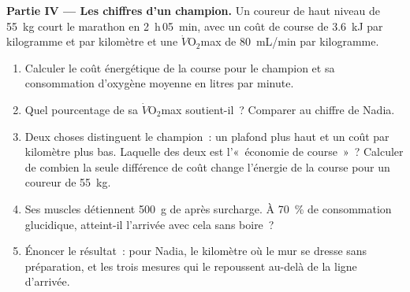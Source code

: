 \begin{problem}
\medskip
\noindent\textbf{Partie IV --- Les chiffres d'un champion.}
Un coureur de haut niveau de \qty{55}{kg} court le marathon en
\qty{2}{h}\,\qty{05}{min}, avec un coût de course de \qty{3.6}{kJ} par
kilogramme et par kilomètre et une $\dot V\!\mathrm{O_2}$max de
\qty{80}{mL/min} par kilogramme.
\begin{enumerate}[resume]
  \item Calculer le coût énergétique de la course pour le champion et
        sa consommation d'oxygène moyenne en litres par minute.
  \item Quel pourcentage de sa $\dot V\!\mathrm{O_2}$max
        soutient-il~? Comparer au chiffre de Nadia.
  \item Deux choses distinguent le champion~: un plafond plus haut et
        un coût par kilomètre plus bas. Laquelle des deux est
        l'«~économie de course~»~? Calculer de combien la seule
        différence de coût change l'énergie de la course pour un
        coureur de \qty{55}{kg}.
  \item Ses muscles détiennent \qty{500}{g} de  après
        surcharge. À 70~\% de consommation glucidique, atteint-il
        l'arrivée avec cela sans boire~?
  \item Énoncer le résultat~: pour Nadia, le kilomètre où le mur se
        dresse sans préparation, et les trois mesures qui le repoussent
        au-delà de la ligne d'arrivée.
\end{enumerate}
\end{problem}
